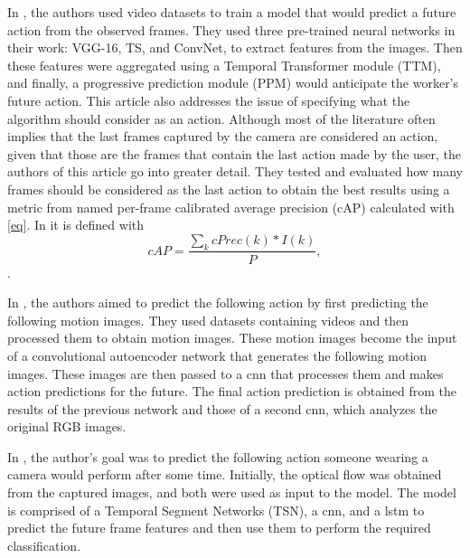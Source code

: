 In \cite{Wang2021}, the authors used video datasets to train a model that would predict a future action from the observed frames. They used three pre-trained neural networks in their work: VGG-16, TS, and ConvNet, to extract features from the images. Then these features were aggregated using a Temporal Transformer module (TTM), and finally, a progressive prediction module (PPM) would anticipate the worker's future action. This article also addresses the issue of specifying what the algorithm should consider as an action. Although most of the literature often implies that the last frames captured by the camera are considered an action, given that those are the frames that contain the last action made by the user, the authors of this article go into greater detail. They tested and evaluated how many frames should be considered as the last action to obtain the best results using a metric from \cite{Geest2016} named per-frame calibrated average precision (cAP) calculated with \eqref{eq}. In \cite{Wang2021} it is defined with
\begin{equation}
cAP=\frac{\sum_k cPrec(k) * I(k)}{P},
\label{eq}
\end{equation}
.

In \cite{Rodriguez2019}, the authors aimed to predict the following action by first predicting the following motion images. They used datasets containing videos and then processed them to obtain motion images. These motion images become the input of a convolutional autoencoder network that generates the following motion images. These images are then passed to a \acs{cnn} that processes them and makes action predictions for the future. The final action prediction is obtained from the results of the previous network and those of a second \acs{cnn}, which analyzes the original RGB images.

In \cite{Wu2021}, the author's goal was to predict the following action someone wearing a camera would perform after some time. Initially, the optical flow was obtained from the captured images, and both were used as input to the model. The model is comprised of a Temporal Segment Networks (TSN), a \acs{cnn}, and a \acs{lstm} to predict the future frame features and then use them to perform the required classification.

